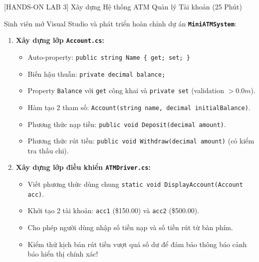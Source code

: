 \documentclass[aspectratio=169, 10pt]{beamer}
\begin{document}
\begin{frame}{[HANDS-ON LAB 3] Xây dựng Hệ thống ATM Quản lý Tài khoản (25 Phút)}
  \begin{tcolorbox}[colback=UniGreen!10,colframe=UniGreen,title=\textbf{Nhiệm vụ Thực hành Phòng máy IT26M: Xây dựng Mini ATM App},fonttitle=\small\bfseries]
    \small Sinh viên mở Visual Studio và phát triển hoàn chỉnh dự án \textbf{\texttt{MiniATMSystem}}:
    \begin{enumerate}\small
      \item \textbf{Xây dựng lớp \texttt{Account.cs}:}
      \begin{itemize}\footnotesize
        \item Auto-property: \texttt{public string Name \{ get; set; \}}
        \item Biến hậu thuẫn: \texttt{private decimal balance;}
        \item Property \texttt{Balance} với \texttt{get} công khai và \texttt{private set} (validation $> 0.0m$).
        \item Hàm tạo 2 tham số: \texttt{Account(string name, decimal initialBalance)}.
        \item Phương thức nạp tiền: \texttt{public void Deposit(decimal amount)}.
        \item Phương thức rút tiền: \texttt{public void Withdraw(decimal amount)} (có kiểm tra thấu chi).
      \end{itemize}
      \item \textbf{Xây dựng lớp điều khiển \texttt{ATMDriver.cs}:}
      \begin{itemize}\footnotesize
        \item Viết phương thức dùng chung \texttt{static void DisplayAccount(Account acc)}.
        \item Khởi tạo 2 tài khoản: \texttt{acc1} (\$150.00) và \texttt{acc2} (\$500.00).
        \item Cho phép người dùng nhập số tiền nạp và số tiền rút từ bàn phím.
        \item Kiểm thử kịch bản rút tiền vượt quá số dư để đảm bảo thông báo cảnh báo hiển thị chính xác!
      \end{itemize}
    \end{enumerate}
  \end{tcolorbox}
\end{frame}
\end{document}
